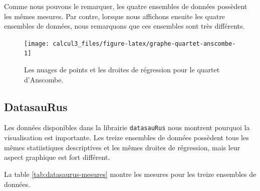\documentclass[]{book}
\theoremstyle{definition}
\theoremstyle{definition}
\theoremstyle{definition}
\theoremstyle{remark}
\begin{document}
Comme nous pouvons le remarquer, les quatre ensembles de données
possèdent les mêmes mesures. Par contre, lorsque nous affichons ensuite
les quatre ensembles de données, nous remarquons que ces ensembles sont
très différents.

\begin{figure}

{\centering \texttt{[image: calcul3\_files/figure-latex/graphe-quartet-anscombe-1]} 

}

\caption{Les nuages de points et les droites de régression pour le quartet d'Anscombe.}\label{fig:graphe-quartet-anscombe}
\end{figure}

\hypertarget{datasaurus}{%
\subsection{DatasauRus}\label{datasaurus}}

Les données disponibles dans la librairie \texttt{datasauRus} nous
montrent pourquoi la visualisation est importante. Les treize ensembles
de données possèdent tous les mêmes statiistiques descriptives et les
mêmes droites de régression, mais leur aspect graphique est fort
différent.

La table \ref{tab:datasaurus-mesures} montre les mesures pour les treize
ensembles de données.
\end{document}
